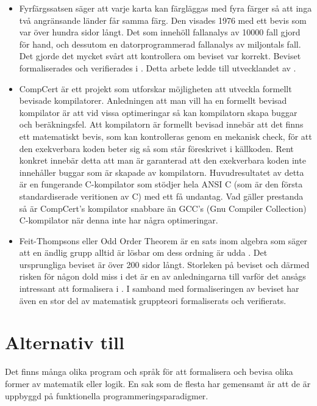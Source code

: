 \begin{itemize}
\item Fyrfärgssatsen \autocite{gonthier2008formal}\cite{gonthier2005computer}
säger att varje karta kan färgläggas med fyra färger så att inga två
angränsande länder får samma färg. Den visades 1976 med ett bevis som var över
hundra sidor långt. Det som innehöll fallanalys av 10000 fall gjord för hand,
och dessutom en datorprogrammerad fallanalys av miljontals fall. Det gjorde det
mycket svårt att kontrollera om beviset var korrekt. Beviset formaliserades och
verifierades i . Detta arbete ledde till utvecklandet av \ssr.

\item CompCert\autocite{compcert} är ett projekt som utforskar möjligheten att
utveckla formellt bevisade kompilatorer. Anledningen att man vill ha en
formellt bevisad kompilator är att vid vissa optimeringar så kan kompilatorn
skapa buggar och beräkningsfel. Att kompilatorn är formellt bevisad innebär att
det finns ett matematiskt bevis, som kan kontrolleras genom en mekanisk check,
för att den exekverbara koden beter sig så som står föreskrivet i källkoden.
Rent konkret innebär detta att man är garanterad att den exekverbara koden inte
innehåller buggar som är skapade av kompilatorn. Huvudresultatet av detta är en
fungerande C-kompilator som stödjer hela ANSI C (som är den första
standardiserade veritionen av C) med ett få undantag. Vad gäller prestanda så
är CompCert's kompilator snabbare än GCC's (Gnu Compiler Collection)
C-kompilator när denna inte har några optimeringar.

\item Feit-Thompsons eller Odd Order Theorem är en sats inom algebra som säger
att en ändlig grupp alltid är lösbar om dess ordning är udda
\cite{gonthier2013oddorderproof}. Det ursprungliga beviset är över 200 sidor
långt\cite{feit1963}. Storleken på beviset och därmed risken för någon dold
miss i det är en av anledningarna till varför det ansågs intressant att
formalisera i \coq. I samband med formaliseringen av beviset har även en stor
del av matematisk gruppteori formaliserats och verifierats.
\end{itemize}

\section{Alternativ till \coq}
Det finns många olika program och språk för att formalisera och bevisa olika
former av matematik eller logik. En sak som de flesta har gemensamt är att de
är uppbyggd på funktionella programmeringsparadigmer.

